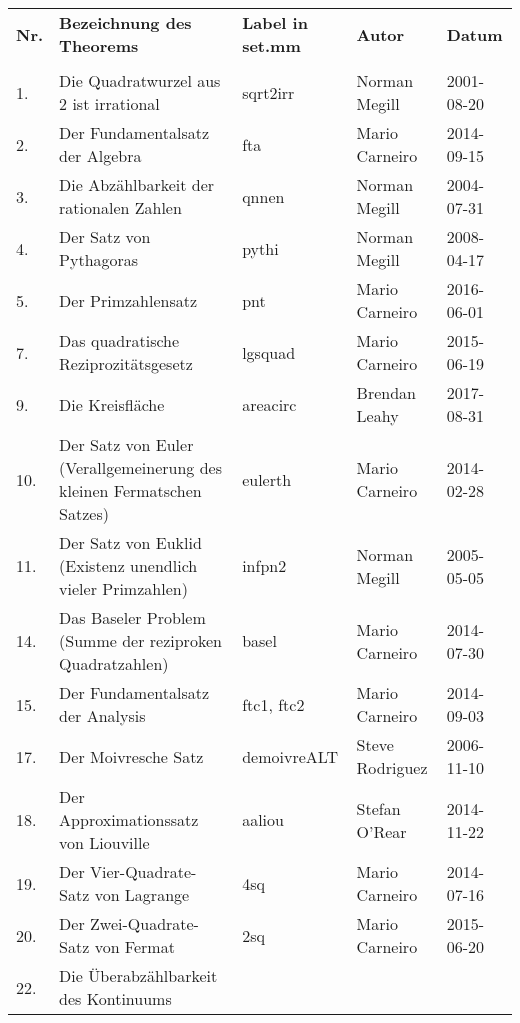 \begin{longtabu}   to \textwidth {
	X[1,c]
	X[10,l]
	X[5,l]
	X[5,l]
	X[5,l]}
\textbf{Nr.} & \textbf{Bezeichnung des Theorems} & \textbf{Label in set.mm} & \textbf{Autor} & \textbf{Datum}\\
& & & & \\
.  & Die Quadratwurzel aus 2 ist irrational        & sqrt2irr     & Norman Megill     & 2001-08-20 \\
2.  & Der Fundamentalsatz der Algebra               & fta          & Mario Carneiro    & 2014-09-15 \\
3.  & Die Abzählbarkeit der rationalen Zahlen       & qnnen        & Norman Megill     & 2004-07-31 \\
4.  & Der Satz von Pythagoras                       & pythi        & Norman Megill     & 2008-04-17 \\
5.  & Der Primzahlensatz                            & pnt          & Mario Carneiro    & 2016-06-01 \\
7.  & Das quadratische Reziprozitätsgesetz          & lgsquad      & Mario Carneiro    & 2015-06-19 \\
9.  & Die Kreisfläche                               & areacirc     & Brendan Leahy     & 2017-08-31 \\
10. & Der Satz von Euler (Verallgemeinerung
      des kleinen Fermatschen Satzes)               & eulerth      & Mario Carneiro    & 2014-02-28 \\
11. & Der Satz von Euklid
      (Existenz unendlich vieler Primzahlen)        & infpn2       & Norman Megill     & 2005-05-05 \\
14. & Das Baseler Problem
      (Summe der reziproken Quadratzahlen)          & basel        & Mario Carneiro    & 2014-07-30 \\
15. & Der Fundamentalsatz der Analysis              & ftc1, ftc2   & Mario Carneiro    & 2014-09-03 \\
17. & Der Moivresche Satz                           & demoivreALT  & Steve Rodriguez   & 2006-11-10 \\
18. & Der Approximationssatz von Liouville          & aaliou       & Stefan O'Rear     & 2014-11-22 \\
19. & Der Vier-Quadrate-Satz von Lagrange           & 4sq          & Mario Carneiro    & 2014-07-16 \\
20. & Der Zwei-Quadrate-Satz von Fermat             & 2sq          & Mario Carneiro    & 2015-06-20 \\
22. & Die Überabzählbarkeit des Kontinuums

\end{longtabu}
